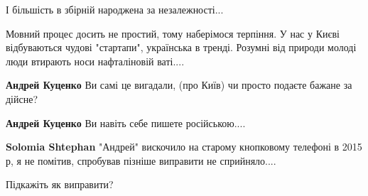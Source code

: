 \begin{itemize}
І більшість в збірній народжена за незалежності...

 
Мовний процес досить не простий, тому наберімося терпіння. У нас у Києві
відбуваються чудові "стартапи", українська в тренді. Розумні від природи молоді
люди втирають носи нафталіновій ваті....

\begin{itemize}
 
\textbf{Андрей Куценко} Ви самі це вигадали, (про Київ) чи просто подаєте бажане за дійсне?

 
\textbf{Андрей Куценко} Ви навіть себе пишете російською....

 
\textbf{Solomia Shtephan} "Андрей" вискочило на старому кнопковому телефоні в
2015 р, я не помітив, спробував пізніше виправити не сприйняло....

 
Підкажіть як виправити?

 

\end{itemize}
\end{itemize}

